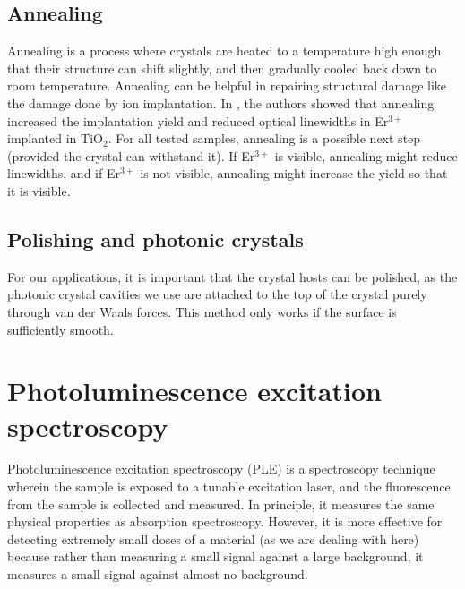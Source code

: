 \documentclass[12pt]{puthesis}
\newcommand{\erbium}[1][ ]{Er$^{3+}$#1}
\newcommand{\TiO}[1][ ]{TiO$_{2}$#1}
\begin{document}
\subsection{Annealing}
\label{sec:annealing}

Annealing is a process where crystals are heated to a temperature high enough that their structure can shift slightly, and then gradually cooled back down to room temperature. Annealing can be helpful in repairing structural damage like the damage done by ion implantation. In \cite{Phenicie2019}, the authors showed that annealing increased the implantation yield and reduced optical linewidths in \erbium implanted in \TiO[.] For all tested samples, annealing is a possible next step (provided the crystal can withstand it). If \erbium is visible, annealing might reduce linewidths, and if \erbium is not visible, annealing might increase the yield so that it is visible. 

\subsection{Polishing and photonic crystals}
\label{sec:polishing}

For our applications, it is important that the crystal hosts can be polished, as the photonic crystal cavities we use are attached to the top of the crystal purely through van der Waals forces. This method only works if the surface is sufficiently smooth. 

\section{Photoluminescence excitation spectroscopy}
\label{sec:phot-excit-spectr}

Photoluminescence excitation spectroscopy (PLE) is a spectroscopy technique wherein the sample is exposed to a tunable excitation laser, and the fluorescence from the sample is collected and measured. In principle, it measures the same physical properties as absorption spectroscopy. However, it is more effective for detecting extremely small doses of a material (as we are dealing with here) because rather than measuring a small signal against a large background, it measures a small signal against almost no background.
\end{document}
